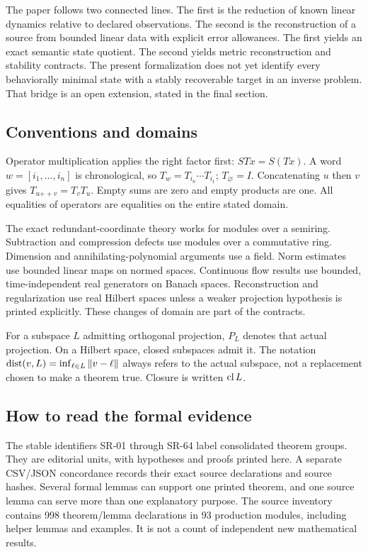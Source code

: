 \documentclass[11pt]{article}
\theoremstyle{definition}\newtheorem{definition}[theorem]{Definition}
\theoremstyle{remark}\newtheorem{remark}[theorem]{Remark}
\newcommand{\nn}[1]{\left\lVert #1\right\rVert}
\begin{document}
The paper follows two connected lines. The first is the reduction of known
linear dynamics relative to declared observations. The second is the
reconstruction of a source from bounded linear data with explicit error
allowances. The first yields an exact semantic state quotient. The second yields
metric reconstruction and stability contracts. The present formalization does
not yet identify every behaviorally minimal state with a stably recoverable
target in an inverse problem. That bridge is an open extension, stated in the
final section.

\subsection{Conventions and domains}
Operator multiplication applies the right factor first: $STx=S(Tx)$.
A word $w=[i_1,\ldots,i_n]$ is chronological, so
$T_w=T_{i_n}\cdots T_{i_1}$; $T_\varnothing=I$. Concatenating $u$ then $v$
gives $T_{u\mathbin{+\!+}v}=T_vT_u$. Empty sums are zero and empty products are one.
All equalities of operators are equalities on the entire stated domain.

The exact redundant-coordinate theory works for modules over a semiring.
Subtraction and compression defects use modules over a commutative ring.
Dimension and annihilating-polynomial arguments use a field. Norm estimates
use bounded linear maps on normed spaces. Continuous flow results use bounded,
time-independent real generators on Banach spaces. Reconstruction and
regularization use real Hilbert spaces unless a weaker projection hypothesis
is printed explicitly. These changes of domain are part of the contracts.

For a subspace $L$ admitting orthogonal projection, $P_L$ denotes that actual
projection. On a Hilbert space, closed subspaces admit it. The notation
$\dist(v,L)=\inf_{\ell\in L}\nn{v-\ell}$ always refers to the actual subspace,
not a replacement chosen to make a theorem true. Closure is written $\operatorname{cl} L$.

\subsection{How to read the formal evidence}
The stable identifiers SR-01 through SR-64 label consolidated theorem groups.
They are editorial units, with hypotheses and proofs printed here. A separate
CSV/JSON concordance records their exact source declarations and source hashes.
Several formal lemmas can support one printed theorem, and one source lemma
can serve more than one explanatory purpose. The source inventory contains
998 theorem/lemma declarations in 93 production modules, including helper
lemmas and examples. It is not a count of independent new mathematical results.
\end{document}
